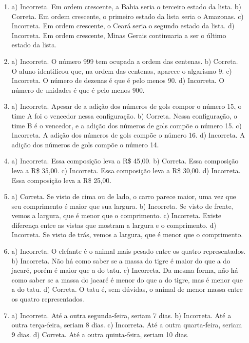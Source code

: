 
\begin{enumerate}
\item
a) Incorreta. Em ordem crescente, a Bahia seria o terceiro estado da lista.
b) Correta. Em ordem crescente, o primeiro estado da lista seria o Amazonas.
c) Incorreta. Em ordem crescente, o Ceará seria o segundo estado da lista.
d) Incorreta. Em ordem crescente, Minas Gerais continuaria a ser o último estado da lista.

\item
a) Incorreta. O número 999 tem ocupada a ordem das centenas.
b) Correta. O aluno identificou que, na ordem das centenas, aparece o
algarismo 9.
c) Incorreta. O número de dezenas é que é pelo menos 90.
d) Incorreta. O número de unidades é que é pelo menos 900.

\item
a) Incorreta. Apesar de a adição dos números de gols compor o número 15, o time A foi o vencedor nessa configuração.
b) Correta. Nessa configuração, o time B é o vencedor, e a adição dos números de gols compõe o número 15.
c) Incorreta. A adição dos números de gols compõe o número 16.
d) Incorreta. A adição dos números de gols compõe o número 14.

\item
a) Incorreta. Essa composição leva a R\$ 45,00.
b) Correta. Essa composição leva a R\$ 35,00.
c) Incorreta. Essa composição leva a R\$ 30,00.
d) Incorreta. Essa composição leva a R\$ 25,00.

\item
a) Correta. Se visto de cima ou de lado, o carro parece maior, uma vez
que seu comprimento é maior que sua largura.
b) Incorreta. Se visto de frente, vemos a largura, que é menor que o
comprimento.
c) Incorreta. Existe diferença entre as vistas que mostram a largura e o
comprimento.
d) Incorreta. Se visto de trás, vemos a largura, que é menor que o
comprimento.

\item
a) Incorreta. O elefante é o animal mais pesado entre os quatro representados.
b) Incorreta. Não há como saber se a massa do tigre é maior do que a do
jacaré, porém é maior que a do tatu.
c) Incorreta. Da mesma forma, não há como saber se a massa do jacaré é
menor do que a do tigre, mas é menor que a do tatu.
d) Correta. O tatu é, sem dúvidas, o animal de menor massa entre os
quatro representados.

\item
a) Incorreta. Até a outra segunda-feira, seriam 7 dias.
b) Incorreta. Até a outra terça-feira, seriam 8 dias.
c) Incorreta. Até a outra quarta-feira, seriam 9 dias.
d) Correta. Até a outra quinta-feira, seriam 10 dias.


\end{enumerate}
